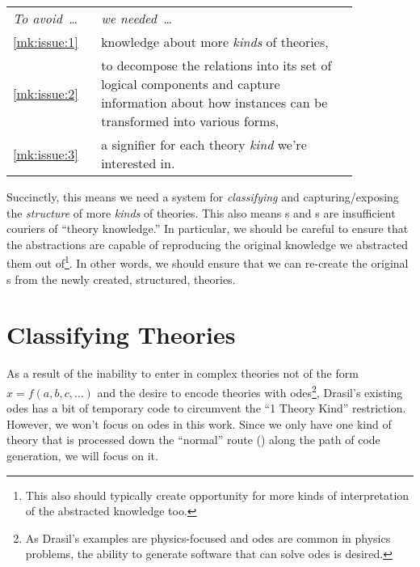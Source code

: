 \begin{longtable}[c]{>{\raggedright}p{0.2\linewidth}>{\raggedright\arraybackslash}p{0.65\linewidth}}
    \textit{To avoid~\ldots{}} & \textit{we needed~\ldots{}}                                    \\
    \ref{mk:issue:1}           & knowledge about more \textit{kinds} of theories,               \\
    \ref{mk:issue:2}           & to decompose the relations into its set of
    logical components and capture information about how instances can be
    transformed into various forms,                                                             \\
    \ref{mk:issue:3}           & a signifier for each theory \textit{kind} we're interested in. \\
\end{longtable}

Succinctly, this means we need a system for \textit{classifying} and
capturing/exposing the \textit{structure} of more \textit{kinds} of theories.
This also means \RelationConcept{}s and \Relation{}s are insufficient couriers
of ``theory knowledge.'' In particular, we should be careful to ensure that the
abstractions are capable of reproducing the original knowledge we abstracted
them out of\footnote{This also should typically create opportunity for more
    kinds of interpretation of the abstracted knowledge too.}. In other words, we
should ensure that we can re-create the original \RelationConcept{}s from the
newly created, structured, theories.

\section{Classifying Theories}
\label{chap:modelkinds:sec:classifying-theories}

As a result of the inability to enter in complex theories not of the form \(x =
f(a, b, c, \ldots{})\) and the desire to encode theories with
\acsp{ode}\footnote{As Drasil's examples are physics-focused and \acsp{ode} are
    common in physics problems, the ability to generate software that can solve
    \acsp{ode} is desired.}, Drasil's existing \acsp{ode} has a bit of temporary code
to circumvent the ``1 Theory Kind'' restriction. However, we won't focus on
\acsp{ode} in this work. Since we only have one kind of theory that is processed
down the ``normal'' route (\relToQD{}) along the path of code generation, we
will focus on it.

